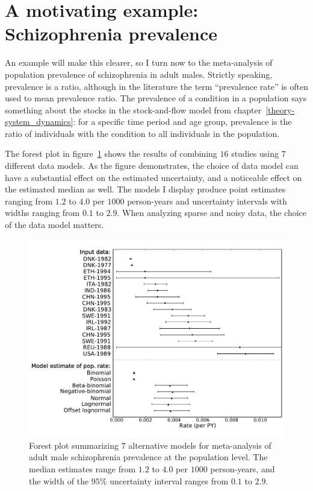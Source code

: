 \section{A motivating example: Schizophrenia prevalence}
An example will make this clearer, so I turn now to the meta-analysis
of population prevalence of schizophrenia in adult males.  Strictly
speaking, prevalence is a ratio, although in the
literature the term ``prevalence rate'' is often used to mean
prevalence ratio.  The prevalence of a condition in a population says
something about the stocks in the stock-and-flow model from
chapter~\ref{theory-system_dynamics}: for a specific time period and
age group, prevalence is the ratio of individuals with the condition
to all individuals in the population.

The forest plot in figure~\ref{rate-model-schiz-forest} shows the
results of combining $16$ studies using $7$ different data models.  As
the figure demonstrates, the choice of data model can have a
substantial effect on the estimated uncertainty, and a
noticeable effect on the estimated median as well. The models I
display produce point estimates ranging from $1.2$ to $4.0$ per
$1000$ person-years and uncertainty intervals with widths ranging from $0.1$ to
$2.9$.  When analyzing sparse and noisy data, the choice of the data model
matters.

\begin{figure}[h]
\begin{center}
\includegraphics[width=\textwidth]{schiz_forest.pdf}
\caption[Forest plot of $7$ alternative models for meta-analysis of schizophrenia.]{Forest
  plot summarizing $7$ alternative models for
  meta-analysis of adult male schizophrenia prevalence at the
  population level.  The median estimates range from
  $1.2$ to
  $4.0$ per $1000$ person-years, and the width of the
  $95\%$ uncertainty interval ranges from
  $0.1$ to
  $2.9$.}
\label{rate-model-schiz-forest}
\end{center}
\end{figure}


